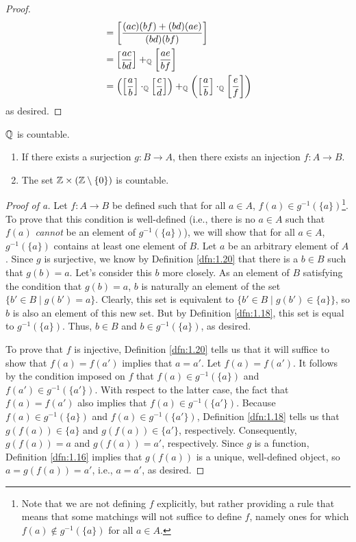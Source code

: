 \documentclass[../main.tex]{subfiles}
\begin{document}
\begin{theorem}
\begin{enumerate}[label={\alph*\textup{)}},ref={\thetheorem\alph*}]
\begin{proof}
\begin{align*}
                &= \left[ \frac{(ac)(bf)+(bd)(ae)}{(bd)(bf)} \right]\\
                &= \left[ \frac{ac}{bd} \right]+_{\mathbb{Q}}\left[ \frac{ae}{bf} \right]\\
                &= \left( \left[ \frac{a}{b} \right]\cdot_{\mathbb{Q}}\left[ \frac{c}{d} \right] \right)+_{\mathbb{Q}}\left( \left[ \frac{a}{b} \right]\cdot_{\mathbb{Q}}\left[ \frac{e}{f} \right] \right)
            \end{align*}
            as desired.
        \end{proof}
    \end{enumerate}
\end{theorem}

\begin{theorem}\label{trm:2.11}
    $\mathbb{Q}$ is countable.
    \begin{lemma*}\leavevmode
        \begin{enumerate}[label={\alph*\textup{)}}]
            \item If there exists a surjection $g:B\to A$, then there exists an injection $f:A\to B$.
            \item The set $\mathbb{Z}\times(\mathbb{Z}\setminus\{0\})$ is countable.
        \end{enumerate}
        \begin{proof}[Proof of a]
            Let $f:A\to B$ be defined such that for all $a\in A$, $f(a)\in g^{-1}(\{a\})$\footnote{Note that we are not defining $f$ explicitly, but rather providing a rule that means that some matchings will not suffice to define $f$, namely ones for which $f(a)\notin g^{-1}(\{a\})$ for all $a\in A$.}. To prove that this condition is well-defined (i.e., there is no $a\in A$ such that $f(a)$ \emph{cannot} be an element of $g^{-1}(\{a\})$), we will show that for all $a\in A$, $g^{-1}(\{a\})$ contains at least one element of $B$. Let $a$ be an arbitrary element of $A$. Since $g$ is surjective, we know by Definition \ref{dfn:1.20} that there is a $b\in B$ such that $g(b)=a$. Let's consider this $b$ more closely. As an element of $B$ satisfying the condition that $g(b)=a$, $b$ is naturally an element of the set $\{b'\in B\mid g(b')=a\}$. Clearly, this set is equivalent to $\{b'\in B\mid g(b')\in\{a\}\}$, so $b$ is also an element of this new set. But by Definition \ref{dfn:1.18}, this set is equal to $g^{-1}(\{a\})$. Thus, $b\in B$ and $b\in g^{-1}(\{a\})$, as desired.\par
            To prove that $f$ is injective, Definition \ref{dfn:1.20} tells us that it will suffice to show that $f(a)=f(a')$ implies that $a=a'$. Let $f(a)=f(a')$. It follows by the condition imposed on $f$ that $f(a)\in g^{-1}(\{a\})$ and $f(a')\in g^{-1}(\{a'\})$. With respect to the latter case, the fact that $f(a)=f(a')$ also implies that $f(a)\in g^{-1}(\{a'\})$. Because $f(a)\in g^{-1}(\{a\})$ and $f(a)\in g^{-1}(\{a'\})$, Definition \ref{dfn:1.18} tells us that $g(f(a))\in\{a\}$ and $g(f(a))\in\{a'\}$, respectively. Consequently, $g(f(a))=a$ and $g(f(a))=a'$, respectively. Since $g$ is a function, Definition \ref{dfn:1.16} implies that $g(f(a))$ is a unique, well-defined object, so $a=g(f(a))=a'$, i.e., $a=a'$, as desired.

\end{proof}
\end{lemma*}
\end{theorem}
\end{document}

